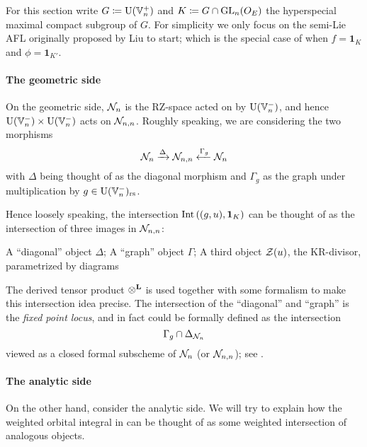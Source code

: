 For this section write $G \coloneqq \operatorname{U}(\mathbb V_n^+)$ and $K \coloneqq G \cap \operatorname{GL}_n(O_E)$
the hyperspecial maximal compact subgroup of $G$.
For simplicity we only focus on the semi-Lie AFL originally proposed by Liu to start;
which is the special case of 
when $f = \mathbf{1}_K$ and $\phi = \mathbf{1}_{K'}$.

\paragraph{The geometric side}
On the geometric side, $\mathcal N_n$ is the RZ-space acted on by $\operatorname{U}(\mathbb V_n^-)$,
and hence $\operatorname{U}(\mathbb V_n^-) \times \operatorname{U}(\mathbb V_n^-)$ acts on $\mathcal N_{n,n}$.
Roughly speaking, we are considering the two morphisms
\[ \mathcal N_n \xrightarrow{\Delta} \mathcal N_{n,n} \xleftarrow{\Gamma_g} \mathcal N_n \]
with $\Delta$ being thought of as the diagonal morphism
and $\Gamma_g$ as the graph under multiplication by $g \in \operatorname{U}(\mathbb V_n^-)_{\mathrm{rs}}$.

Hence loosely speaking, the intersection $\operatorname{Int}\left( (g,u), \mathbf{1}_K \right)$
can be thought of as the intersection of three images in $\mathcal N_{n,n}$:
\begin{itemize}
  \ii A ``diagonal'' object $\Delta$;
  \ii A ``graph'' object $\Gamma$;
  \ii A third object $\mathcal Z(u)$, the KR-divisor, parametrized by diagrams
  \begin{center}
  \end{center}
\end{itemize}
The derived tensor product $\mathop{\otimes}^{\mathbf{L}}$
is used together with some formalism to make this intersection idea precise.
The intersection of the ``diagonal'' and ``graph'' is the \emph{fixed point locus},
and in fact could be formally defined as the intersection
\[ \Gamma_g \cap \Delta_{\mathcal N_n} \]
viewed as a closed formal subscheme of $\mathcal N_n$ (or $\mathcal N_{n,n}$);
see \cite[equation (4.6)]{ref:survey}.

\paragraph{The analytic side}
On the other hand, consider the analytic side.
We will try to explain how the weighted orbital integral in 
can be thought of as some weighted intersection of analogous objects.

